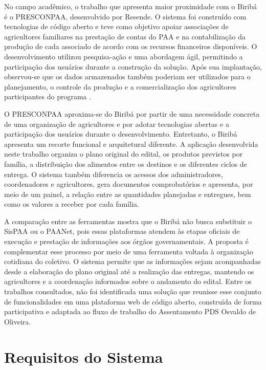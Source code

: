 No campo acadêmico, o trabalho que apresenta maior proximidade com o Biribá é o PRESCONPAA, desenvolvido por Resende. O sistema foi construído com tecnologias de código aberto e teve como objetivo apoiar associações de agricultores familiares na prestação de contas do PAA e na contabilização da produção de cada associado de acordo com os recursos financeiros disponíveis. O desenvolvimento utilizou pesquisa-ação e uma abordagem ágil, permitindo a participação dos usuários durante a construção da solução. Após sua implantação, observou-se que os dados armazenados também poderiam ser utilizados para o planejamento, o controle da produção e a comercialização dos agricultores participantes do programa \cite{resende2013presconpaa}.

O PRESCONPAA aproxima-se do Biribá por partir de uma necessidade concreta de uma organização de agricultores e por adotar tecnologias abertas e a participação dos usuários durante o desenvolvimento. Entretanto, o Biribá apresenta um recorte funcional e arquitetural diferente. A aplicação desenvolvida neste trabalho organiza o plano original do edital, os produtos previstos por família, a distribuição dos alimentos entre os destinos e os diferentes ciclos de entrega. O sistema também diferencia os acessos dos administradores, coordenadores e agricultores, gera documentos comprobatórios e apresenta, por meio de um painel, a relação entre as quantidades planejadas e entregues, bem como os valores a receber por cada família.

A comparação entre as ferramentas mostra que o Biribá não busca substituir o SisPAA ou o PAANet, pois essas plataformas atendem às etapas oficiais de execução e prestação de informações aos órgãos governamentais. A proposta é complementar esse processo por meio de uma ferramenta voltada à organização cotidiana do coletivo. O sistema permite que as informações sejam acompanhadas desde a elaboração do plano original até a realização das entregas, mantendo os agricultores e a coordenação informados sobre o andamento do edital. Entre os trabalhos consultados, não foi identificada uma solução que reunisse esse conjunto de funcionalidades em uma plataforma web de código aberto, construída de forma participativa e adaptada ao fluxo de trabalho do Assentamento PDS Osvaldo de Oliveira.

\section{Requisitos do Sistema}

